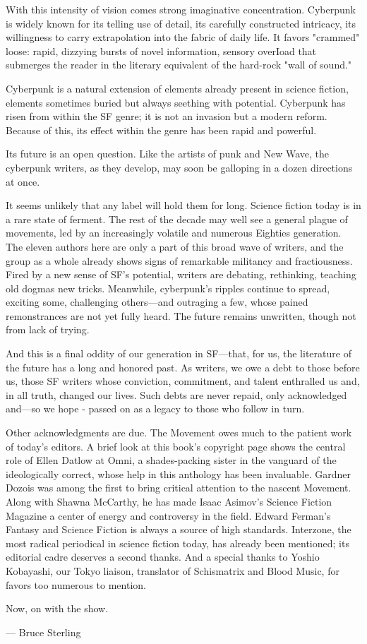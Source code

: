 With this intensity of vision comes strong imaginative concentration. Cyberpunk is widely known for its telling use of detail, its carefully constructed intricacy, its willingness to carry extrapolation into the fabric of daily life. It favors "crammed" loose: rapid, dizzying bursts of novel information, sensory overIoad that submerges the reader in the literary equivalent of the hard-rock "wall of sound."

Cyberpunk is a natural extension of elements already present in science fiction, elements sometimes buried but always seething with potential. Cyberpunk has risen from within the SF genre; it is not an invasion but a modern reform. Because of this, its effect within the genre has been rapid and powerful.

Its future is an open question. Like the artists of punk and New Wave, the cyberpunk writers, as they develop, may soon be galloping in a dozen directions at once.

It seems unlikely that any label will hold them for long. Science fiction today is in a rare state of ferment. The rest of the decade may well see a general plague of movements, led by an increasingly volatile and numerous Eighties generation. The eleven authors here are only a part of this broad wave of writers, and the group as a whole already shows signs of remarkable militancy and fractiousness. Fired by a new sense of SF's potential, writers are debating, rethinking, teaching old dogmas new tricks. Meanwhile, cyberpunk's ripples continue to spread, exciting some, challenging others—and outraging a few, whose pained remonstrances are not yet fully heard.
The future remains unwritten, though not from lack of trying.

And this is a final oddity of our generation in SF—that, for us, the literature of the future has a long and honored past. As writers, we owe a debt to those before us, those SF writers whose conviction, commitment, and talent enthralled us and, in all truth, changed our lives. Such debts are never repaid, only acknowledged and—so we hope - passed on as a legacy to those who follow in turn.

Other acknowledgments are due. The Movement owes much to the patient work of today's editors. A brief look at this book's copyright page shows the central role of Ellen Datlow at Omni, a shades-packing sister in the vanguard of the ideologically correct, whose help in this anthology has been invaluable. Gardner Dozois was among the first to bring critical attention to the nascent Movement. Along with Shawna McCarthy, he has made Isaac Asimov's Science Fiction Magazine a center of energy and controversy in the field. Edward Ferman's Fantasy and Science Fiction is always a source of high standards. Interzone, the most radical periodical in science fiction today, has already been mentioned; its editorial cadre deserves a second thanks. And a special thanks to Yoshio Kobayashi, our Tokyo liaison, translator of Schismatrix and Blood Music, for favors too numerous to mention.

Now, on with the show.

— Bruce Sterling

